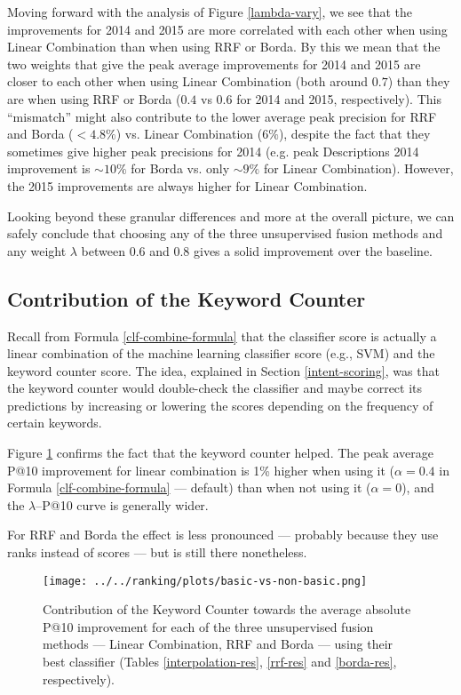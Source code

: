 Moving forward with the analysis of Figure \ref{lambda-vary}, we see that
the improvements for 2014 and 2015 are more correlated with each other when using Linear Combination than when using
RRF or Borda. By this we mean that the two weights that give the peak average improvements for 2014 and 2015 are closer to each other
when using Linear Combination (both around $0.7$) than they are when using RRF or Borda ($0.4$ vs $0.6$ for 2014 and 2015, respectively).
This ``mismatch'' might also contribute to the lower average peak precision for RRF and Borda ($<4.8\%$)
vs. Linear Combination ($6\%$), despite the fact that they sometimes
give higher peak precisions for 2014 (e.g. peak Descriptions 2014 improvement
is $\sim10\%$ for Borda vs. only $\sim9\%$ for Linear Combination). However, the 2015 improvements are always higher for
Linear Combination.

Looking beyond these granular differences and more at the overall picture, we can safely conclude
that choosing any of the three unsupervised fusion methods and any weight $\lambda$ between 0.6 and 0.8 gives
a solid improvement over the baseline.

\subsection{Contribution of the Keyword Counter}
Recall from Formula \ref{clf-combine-formula} that the classifier score is actually
a linear combination of the machine learning classifier score (e.g., SVM) and the keyword counter score. The idea,
explained in Section \ref{intent-scoring},
was that the keyword counter would double-check the classifier and maybe correct its predictions by
increasing or lowering the scores depending on the frequency of certain keywords.

Figure \ref{basic-effect-plot}
confirms the fact that the keyword counter helped. The peak average P@10 improvement for linear combination is 1\% higher
when using it ($\alpha=0.4$ in Formula \ref{clf-combine-formula} --- default) than when not using it ($\alpha=0$), and the $\lambda$--P@10 curve is generally wider.

For RRF and Borda the effect is less pronounced --- probably because they use ranks instead of scores ---
but is still there nonetheless.

\begin{figure}
\centerline{
  \hspace*{1.5cm}\texttt{[image: ../../ranking/plots/basic-vs-non-basic.png]}
  }
  \caption{Contribution of the Keyword Counter towards the average absolute P@10 improvement for each of the three unsupervised
  fusion methods --- Linear Combination, RRF and Borda --- using their best classifier (Tables \ref{interpolation-res}, \ref{rrf-res}
and \ref{borda-res}, respectively).}
  \label{basic-effect-plot}
\end{figure}

